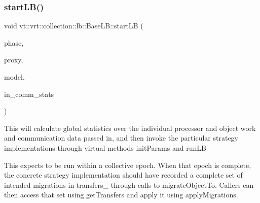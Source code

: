 \mbox{\label{structvt_1_1vrt_1_1collection_1_1lb_1_1_base_l_b_a47fca52d6d490f8ab83aaea5058abf92}} 
\subsubsection{\texorpdfstring{start\+L\+B()}{startLB()}}
{\footnotesize\ttfamily void vt\+::vrt\+::collection\+::lb\+::\+Base\+L\+B\+::start\+LB (\begin{DoxyParamCaption}\item[{\hyperlink{namespacevt_a46ce6733d5cdbd735d561b7b4029f6d7}{Phase\+Type}}]{phase,  }\item[{\hyperlink{structvt_1_1objgroup_1_1proxy_1_1_proxy}{objgroup\+::proxy\+::\+Proxy}$<$ \hyperlink{structvt_1_1vrt_1_1collection_1_1lb_1_1_base_l_b}{Base\+LB} $>$}]{proxy,  }\item[{\hyperlink{classvt_1_1vrt_1_1collection_1_1balance_1_1_load_model}{balance\+::\+Load\+Model} $\ast$}]{model,  }\item[{\hyperlink{structvt_1_1vrt_1_1collection_1_1lb_1_1_base_l_b_ac3f8560bfe41aa593eb7d5bd1241cc4c}{Element\+Comm\+Type} const \&}]{in\+\_\+comm\+\_\+stats }\end{DoxyParamCaption})}

This will calculate global statistics over the individual processor and object work and communication data passed in, and then invoke the particular strategy implementations through virtual methods {\ttfamily init\+Params} and {\ttfamily run\+LB}

This expects to be run within a collective epoch. When that epoch is complete, the concrete strategy implementation should have recorded a complete set of intended migrations in {\ttfamily transfers\+\_\+} through calls to {\ttfamily migrate\+Object\+To}. Callers can then access that set using {\ttfamily get\+Transfers} and apply it using {\ttfamily apply\+Migrations}. \mbox{\label{structvt_1_1vrt_1_1collection_1_1lb_1_1_base_l_b_a0caca58b47838888ed2b4c3987bd9745}} 
